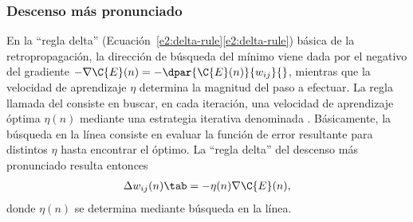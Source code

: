 %
\subsubsection{Descenso más pronunciado}
%
En la ``regla delta''
(\iflatexml{}Ecuación~\ref{e2:delta-rule}\else\autoref{e2:delta-rule}\fi)
básica de la retropropagación, la dirección de búsqueda del mínimo
viene dada por el negativo del gradiente
$-\nabla\C{E}(n)=-\dpar{\C{E}(n)}{w_{ij}}{}$, mientras que la
velocidad de aprendizaje $\eta$ determina la magnitud del paso a
efectuar.
La regla llamada del  consiste
en buscar, en cada iteración, una velocidad de aprendizaje óptima
$\eta(n)$ mediante una estrategia iterativa denominada .  Básicamente, la búsqueda en la línea consiste en evaluar
la función de error resultante para distintos $\eta$ hasta encontrar
el óptimo.  La ``regla delta'' del descenso más pronunciado resulta
entonces
%
\begin{align}\label{e2:delta-rule-steepest}
  \Delta w_{ij}(n)\tab=-\eta(n)\nabla{\C{E}(n)},
\end{align}
%
donde $\eta(n)$ se determina mediante búsqueda en la línea.
%
